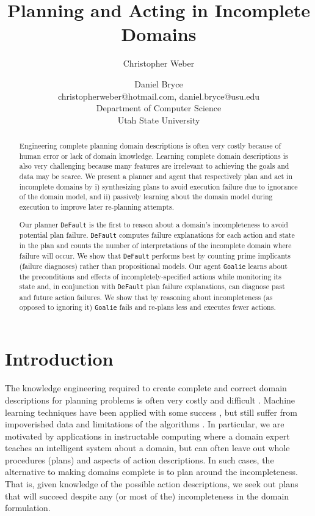 \documentclass[letterpaper]{article}
\def\default{{\tt DeFault}}
\def\goalie{{\tt Goalie}}
\def\citep#1{\cite{#1}}
\begin{document}
\title{Planning and Acting in Incomplete Domains}

\author{
Christopher Weber \and Daniel Bryce\\
christopherweber@hotmail.com, daniel.bryce@usu.edu\\
Department of Computer Science\\
Utah State University
}

\maketitle

\begin{abstract}
Engineering complete planning domain descriptions is often very costly because
of human error or lack of domain knowledge. Learning complete domain
descriptions is also very challenging because many features are irrelevant to
achieving the goals and data may be scarce.  We present a planner and agent
that respectively plan and act in incomplete domains by i) synthesizing plans
to avoid execution failure due to ignorance of the domain model, and ii) passively learning about the
domain model during execution to improve later re-planning attempts.

Our planner \default{} is the first to reason about a domain's incompleteness to
avoid potential plan failure.  \default{} computes failure explanations for each
action and state in the plan and counts the number of interpretations of the
incomplete domain where failure will occur. We show that \default{} performs
best by counting  prime implicants (failure diagnoses) rather than propositional
models. Our agent \goalie{} learns about the preconditions and effects of
incompletely-specified actions while monitoring its state and, in conjunction
with \default{} plan failure explanations, can diagnose past and future action
failures.   We show that by reasoning about incompleteness (as
opposed to ignoring it) \goalie{} fails and re-plans less and executes fewer
actions.

\end{abstract}


\section{Introduction}
The knowledge engineering required to create complete and correct domain
descriptions for planning problems is often very costly and difficult
\citep{modellite,arms}.  Machine learning techniques have been applied with some
success \citep{arms}, but still suffer from impoverished data and limitations of
the algorithms \citep{modellite}.   In particular, we are motivated by
applications in instructable computing \citep{mable} where a domain expert
teaches an intelligent system about a domain, but can often leave out whole
procedures (plans) and aspects of action descriptions.   In such cases, the
alternative to making domains complete is to plan around the incompleteness. 
That is, given knowledge of the possible action descriptions, we seek out plans
that will succeed despite any (or most of the) incompleteness in the domain
formulation.
\end{document}
